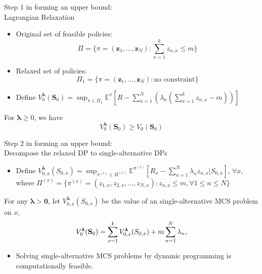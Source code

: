\documentclass{beamer}
\newcommand{\Sv}{\mathbf{S}}
\newcommand{\lambdav}{\pmb{\lambda}}
\newcommand{\zv}{\mathbf{z}}
\begin{document}
\begin{frame}{Step 1 in forming an upper bound:\\Lagrangian Relaxation}

\begin{itemize}
\item Original set of feasible policies:
\[\Pi = \{\pi=(\zv_1,...,\zv_N):\sum_{x=1}^k z_{n,x}\leq m\}\]
\item Relaxed set of policies:
\[\Pi_1 = \{\pi=(\zv_1,...,\zv_N):\text{no constraint}\}\]
\item Define $V_0^{\lambdav}(\Sv_0) = \sup_{\pi\in \Pi_1}\mathbb{E}^{\pi}[R-\sum_{n=1}^N(\lambda_n(\sum_{x=1}^kz_{n,x}-m))]$
\end{itemize}
\begin{lemma}[1]
For $\lambdav\geq 0$, we have
\begin{equation*}
V_0^{\lambdav}(\Sv_0) \geq V_0(\Sv_0)
\end{equation*}
\end{lemma}

\end{frame}

\begin{frame}{Step 2 in forming an upper bound:\\ Decompose the relaxed DP to single-alternative DPs}
\begin{itemize}
\item Define $V_{0,x}^{\lambdav}(S_{0,x}) = \sup_{\pi^{(x)}\in \Pi^{(x)}}\mathbb{E}^{\pi^{(x)}}\left[R_x - \sum_{n=1}^{N}\lambda_nz_{n,x}\Big|S_{0,x}\right]$, $\forall x$,\\
where $\Pi^{(x)}=\{\pi^{(x)} = (z_{1,x},z_{2,x},...,z_{N,x}): z_{n,x}\leq m, \forall 1\leq n\leq N\}$
\end{itemize}
\begin{lemma}[2]
For any $\lambdav>\mathbf{0}$, let $V_{0,x}^{\lambdav}(S_{0,x})$ be the value of an single-alternative MCS problem on $x$, 
\begin{equation} \label{decom}
\footnotesize
V_{0}^{\lambdav}(\Sv_0) = \sum_{x=1}^k V_{0,x}^{\lambdav}(S_{0,x}) + m\sum_{n = 1}^{N}\lambda_{n},
\end{equation}
\end{lemma}
\begin{itemize}
\item Solving single-alternative MCS problems by dynamic programming is computationally feasible.
\end{itemize}


\end{frame}
\end{document}
